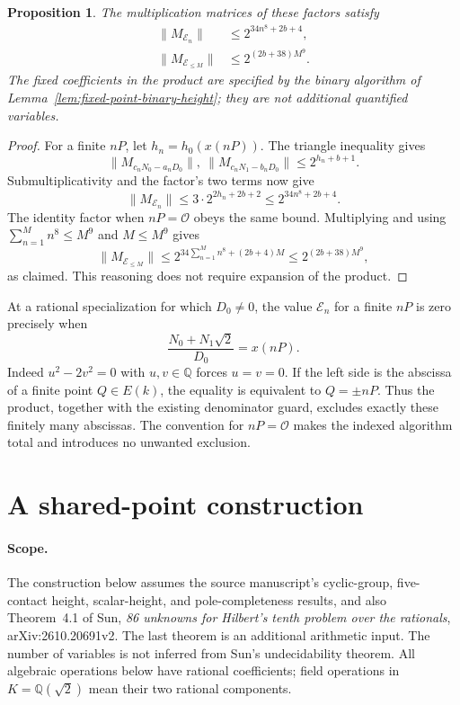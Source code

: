 \documentclass[11pt]{article}
\newtheorem{proposition}[theorem]{Proposition}
\theoremstyle{definition}
\begin{document}
\begin{proposition}\label{prop:fixed-exclusion-norm}
The multiplication matrices of these factors satisfy
\[
 \begin{aligned}
  \|M_{\mathcal E_n}\|&\le2^{34n^8+2b+4},\\
  \|M_{\mathcal E_{\le M}}\|&\le2^{(2b+38)M^9}.
 \end{aligned}
\]
The fixed coefficients in the product are specified by the binary
algorithm of Lemma~\ref{lem:fixed-point-binary-height}; they are not
additional quantified variables.
\end{proposition}
\begin{proof}
For a finite $nP$, let $h_n=h_0(x(nP))$.  The triangle inequality
gives
\[
 \|M_{c_nN_0-a_nD_0}\|,\ \|M_{c_nN_1-b_nD_0}\|
       \le2^{h_n+b+1}.
\]
Submultiplicativity and the factor's two terms now give
\[
 \|M_{\mathcal E_n}\|
     \le3\cdot2^{2h_n+2b+2}
     \le2^{34n^8+2b+4}.
\]
The identity factor when $nP=\mathcal O$ obeys the same bound.
Multiplying and using $\sum_{n=1}^M n^8\le M^9$ and $M\le M^9$
gives
\[
 \|M_{\mathcal E_{\le M}}\|
 \le2^{34\sum_{n=1}^M n^8+(2b+4)M}
 \le2^{(2b+38)M^9},
\]
as claimed.  This reasoning does not require expansion of the product.
\end{proof}

At a rational specialization for which $D_0\ne0$, the value
$\mathcal E_n$ for a finite $nP$ is zero precisely when
\[
               \frac{N_0+N_1\sqrt2}{D_0}=x(nP).
\]
Indeed $u^2-2v^2=0$ with $u,v\in\mathbb Q$ forces $u=v=0$.
If the left side is the abscissa of a finite point $Q\in E(k)$,
the equality is equivalent to $Q=\pm nP$.  Thus the product,
together with the existing denominator guard, excludes exactly these
finitely many abscissas.  The convention for $nP=\mathcal O$ makes
the indexed algorithm total and introduces no unwanted exclusion.


\section{A shared-point construction}
\label{sec:new-shared-source}

\paragraph{Scope.}
The construction below assumes the source manuscript's cyclic-group,
five-contact height, scalar-height, and pole-completeness results, and also
Theorem~4.1 of Sun, \emph{86 unknowns for Hilbert's tenth problem over the
rationals}, arXiv:2610.20691v2. The last theorem is an additional arithmetic
input. The number of variables is not inferred from Sun's undecidability
theorem. All algebraic operations below have rational coefficients; field
operations in $K=\mathbb Q(\sqrt2)$ mean their two rational components.
\end{document}
